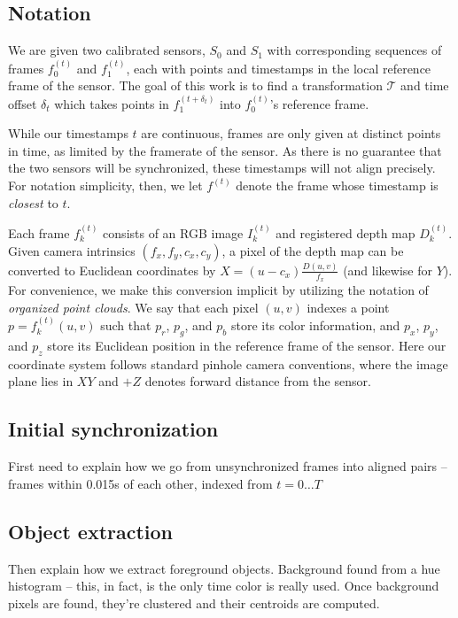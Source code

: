 \documentclass[letterpaper, 10 pt, conference]{ieeeconf}  %
\begin{document}
\subsection{Notation}

We are given two calibrated sensors, $S_0$ and $S_1$ with corresponding sequences of frames $f_0^{(t)}$ and $f_1^{(t)}$, each with points and timestamps in the local reference frame of the sensor. The goal of this work is to find a transformation $\mathcal{T}$ and time offset $\delta_t$ which takes points in $f_1^{(t+\delta_t)}$ into $f_0^{(t)}$'s reference frame. 

While our timestamps $t$ are continuous, frames are only given at distinct points in time, as limited by the framerate of the sensor. 
As there is no guarantee that the two sensors will be synchronized, these timestamps will not align precisely. 
For notation simplicity, then, we let $f^{(t)}$ denote the frame whose timestamp is \emph{closest} to $t$.


Each frame $f_k^{(t)}$ consists of an RGB image $I_k^{(t)}$ and registered depth map $D_k^{(t)}$. Given camera intrinsics 
$(f_x,f_y,c_x,c_y)$, a pixel of the depth map can be converted to Euclidean coordinates by $X = (u-c_x)\frac{D(u,v)}{f_x}$ (and likewise for $Y$). 
For convenience, we make this conversion implicit by utilizing the notation of \emph{organized point clouds}.
We say that each pixel $(u,v)$ indexes a point $p = f_k^{(t)}(u,v)$ such that $p_r$, $p_g$, and $p_b$ store its color information, and $p_x$, $p_y$, and $p_z$ store its Euclidean 
position in the reference frame of the sensor. Here our coordinate system follows standard
pinhole camera conventions, where the image plane lies in $XY$ and $+Z$ denotes forward distance from the sensor.

\subsection{Initial synchronization}
First need to explain how we go from unsynchronized frames into aligned pairs -- frames within 0.015s of each other, indexed from $t = 0{\dots}T$

\subsection{Object extraction}
Then explain how we extract foreground objects. Background found from a hue histogram -- this, in fact, is the 
only time color is really used. Once background pixels are found, they're clustered and their centroids are 
computed.
\end{document}
